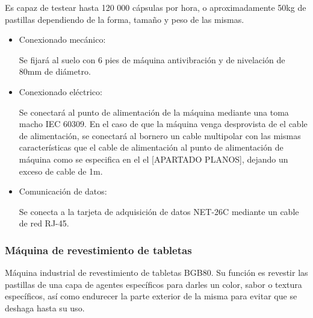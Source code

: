 	Es capaz de testear hasta 120 000 cápsulas por hora, o aproximadamente 50kg de pastillas dependiendo de la forma, tamaño y peso de las mismas.\\



		\begin{itemize}
				\item{Conexionado mecánico:}
				
				Se fijará al suelo con 6 pies de máquina antivibración y de nivelación de 80mm de diámetro.

				\item{Conexionado eléctrico:}

				Se conectará al punto de alimentación de la máquina mediante una  toma macho IEC 60309. En el caso de que la máquina venga desprovista de el cable de alimentación, se conectará al bornero un cable multipolar con las mismas características que el cable de alimentación al punto de alimentación de máquina como se especifica en el el [APARTADO PLANOS], dejando un exceso de cable de 1m. \
				
				\item{Comunicación de datos:}

				Se conecta a la tarjeta de adquisición de datos NET-26C mediante un cable de red RJ-45.
		\end{itemize}

	\newpage


	\subsubsection{Máquina de revestimiento de tabletas}
		
	
	
	Máquina industrial de revestimiento de tabletas BGB80. Su función es revestir las pastillas de una capa de agentes específicos para darles un color, sabor o textura específicos, así como endurecer la parte exterior de la misma para evitar que se deshaga hasta su uso.\\

